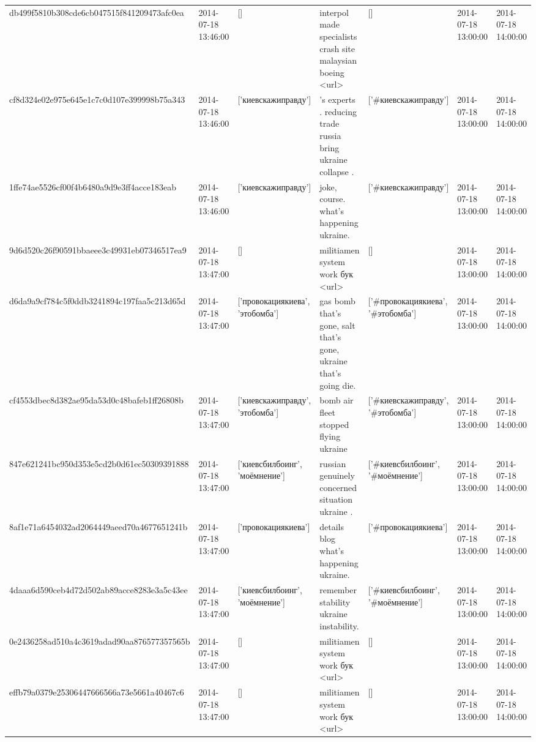 \begin{tabular}{lllllll}
db499f5810b308cde6cb047515f841209473afc0ea & 2014-07-18 13:46:00 & [] & interpol made specialists crash site malaysian boeing <url> & [] & 2014-07-18 13:00:00 & 2014-07-18 14:00:00 \\
cf8d324e02e975e645e1c7c0d107e399998b75a343 & 2014-07-18 13:46:00 & ['киевскажиправду'] & 's experts . reducing trade russia bring ukraine collapse . & ['#киевскажиправду'] & 2014-07-18 13:00:00 & 2014-07-18 14:00:00 \\
1ffe74ae5526cf00f4b6480a9d9e3ff4acce183eab & 2014-07-18 13:46:00 & ['киевскажиправду'] & joke, course. what's happening ukraine. & ['#киевскажиправду'] & 2014-07-18 13:00:00 & 2014-07-18 14:00:00 \\
9d6d520c26f90591bbaeee3c49931eb07346517ea9 & 2014-07-18 13:47:00 & [] & militiamen system work бук <url> & [] & 2014-07-18 13:00:00 & 2014-07-18 14:00:00 \\
d6da9a9cf784c5f0ddb3241894c197faa5c213d65d & 2014-07-18 13:47:00 & ['провокациякиева', 'этобомба'] & gas bomb that's gone, salt that's gone, ukraine that's going die. & ['#провокациякиева', '#этобомба'] & 2014-07-18 13:00:00 & 2014-07-18 14:00:00 \\
cf4553dbec8d382ae95da53d0c48bafeb1ff26808b & 2014-07-18 13:47:00 & ['киевскажиправду', 'этобомба'] & bomb air fleet stopped flying ukraine & ['#киевскажиправду', '#этобомба'] & 2014-07-18 13:00:00 & 2014-07-18 14:00:00 \\
847e621241bc950d353e5cd2b0d61ec50309391888 & 2014-07-18 13:47:00 & ['киевсбилбоинг', 'моёмнение'] & russian genuinely concerned situation ukraine . & ['#киевсбилбоинг', '#моёмнение'] & 2014-07-18 13:00:00 & 2014-07-18 14:00:00 \\
8af1e71a6454032ad2064449aeed70a4677651241b & 2014-07-18 13:47:00 & ['провокациякиева'] & details blog what's happening ukraine. & ['#провокациякиева'] & 2014-07-18 13:00:00 & 2014-07-18 14:00:00 \\
4daaa6d590ceb4d72d502ab89acce8283e3a5c43ee & 2014-07-18 13:47:00 & ['киевсбилбоинг', 'моёмнение'] & remember stability ukraine instability. & ['#киевсбилбоинг', '#моёмнение'] & 2014-07-18 13:00:00 & 2014-07-18 14:00:00 \\
0e2436258ad510a4c3619adad90aa876577357565b & 2014-07-18 13:47:00 & [] & militiamen system work бук <url> & [] & 2014-07-18 13:00:00 & 2014-07-18 14:00:00 \\
effb79a0379e25306447666566a73e5661a40467c6 & 2014-07-18 13:47:00 & [] & militiamen system work бук <url> & [] & 2014-07-18 13:00:00 & 2014-07-18 14:00:00 \\

\end{tabular}
